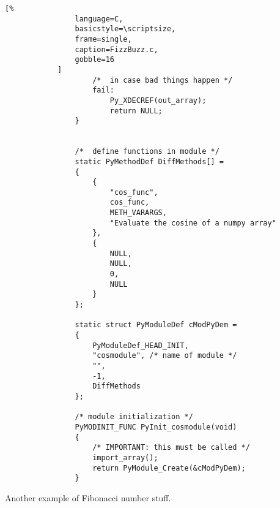 \documentclass[crop=false,class=book,oneside]{standalone}
\begin{document}
\begin{lstlisting}[%
                language=C,
                basicstyle=\scriptsize,
                frame=single,
                caption=FizzBuzz.c,
                gobble=16
            ]
                    /*  in case bad things happen */
                    fail:
                        Py_XDECREF(out_array);
                        return NULL;
                }
                
                
                /*  define functions in module */
                static PyMethodDef DiffMethods[] =
                {
                    {
                        "cos_func",
                        cos_func,
                        METH_VARARGS,
                        "Evaluate the cosine of a numpy array"
                    },
                    {
                        NULL,
                        NULL,
                        0,
                        NULL
                    }
                };
                
                static struct PyModuleDef cModPyDem =
                {
                    PyModuleDef_HEAD_INIT,
                    "cosmodule", /* name of module */
                    "",
                    -1,
                    DiffMethods
                };
                
                /* module initialization */
                PyMODINIT_FUNC PyInit_cosmodule(void)
                {
                    /* IMPORTANT: this must be called */
                    import_array();
                    return PyModule_Create(&cModPyDem);
                }
            \end{lstlisting}
            Another example of Fibonacci number stuff.
            \newpage
\end{document}
